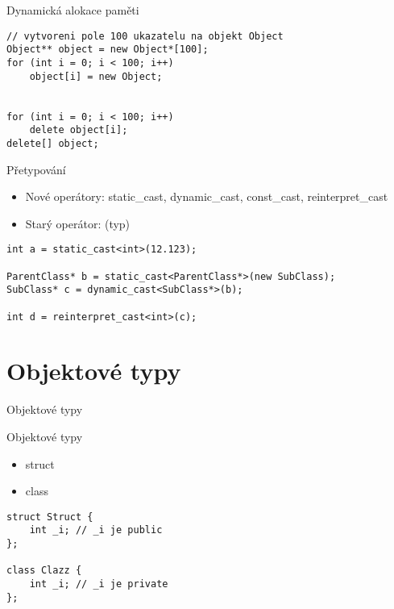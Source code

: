\begin{frame}[fragile]
\begin{exampleblock}{Dynamická alokace paměti}
\begin{lstlisting}
// vytvoreni pole 100 ukazatelu na objekt Object
Object** object = new Object*[100];
for (int i = 0; i < 100; i++)
	object[i] = new Object;


for (int i = 0; i < 100; i++)
	delete object[i];
delete[] object;
\end{lstlisting}
\end{exampleblock}
\end{frame}

\begin{frame}[fragile]
\begin{block}{Přetypování}
\begin{itemize}
\item Nové operátory: static\_cast, dynamic\_cast, const\_cast, reinterpret\_cast 
\item Starý operátor: (typ)
\end{itemize}
\end{block}
\begin{exampleblock}{}
\begin{lstlisting}
int a = static_cast<int>(12.123);

ParentClass* b = static_cast<ParentClass*>(new SubClass);
SubClass* c = dynamic_cast<SubClass*>(b);

int d = reinterpret_cast<int>(c);
\end{lstlisting}
\end{exampleblock}
\end{frame}

\section{Objektové typy}

\begin{frame}
\begin{block}{}
\begin{center}
\Huge
Objektové typy
\end{center}
\end{block}
\end{frame}

\begin{frame}[fragile]
\begin{block}{Objektové typy}
\begin{itemize}
\item struct
\item class
\end{itemize}
\end{block}
\begin{exampleblock}{}
\begin{lstlisting}
struct Struct {
	int _i; // _i je public
};

class Clazz {
	int _i; // _i je private
};

\end{lstlisting}
\end{exampleblock}
\end{frame}


